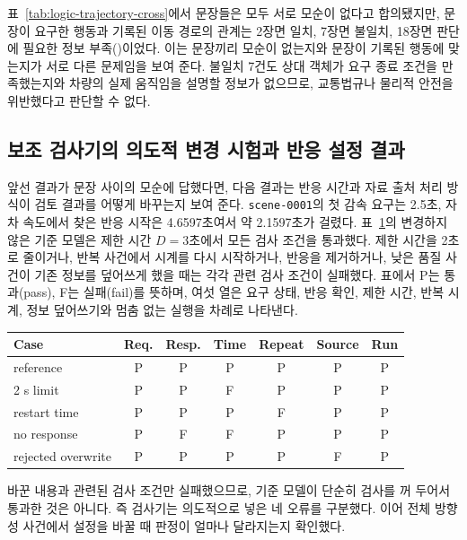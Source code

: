 표~\ref{tab:logic-trajectory-cross}에서 문장들은 모두 서로 모순이 없다고 합의됐지만, 문장이 요구한 행동과 기록된 이동 경로의 관계는 2장면 일치, 7장면 불일치, 18장면 판단에 필요한 정보 부족({\unknown})이었다. 이는 문장끼리 모순이 없는지와 문장이 기록된 행동에 맞는지가 서로 다른 문제임을 보여 준다. 불일치 7건도 상대 객체가 요구 종료 조건을 만족했는지와 차량의 실제 움직임을 설명할 정보가 없으므로, 교통법규나 물리적 안전을 위반했다고 판단할 수 없다.

\subsection{보조 검사기의 의도적 변경 시험과 반응 설정 결과}

앞선 결과가 문장 사이의 모순에 답했다면, 다음 결과는 반응 시간과 자료 출처 처리 방식이 검토 결과를 어떻게 바꾸는지 보여 준다. \texttt{scene-0001}의 첫 감속 요구는 2.5초, 자차 속도에서 찾은 반응 시작은 4.6597초여서 약 2.1597초가 걸렸다. 표~\ref{tab:scene1-results}의 변경하지 않은 기준 모델은 제한 시간 $D=3$초에서 모든 검사 조건을 통과했다. 제한 시간을 2초로 줄이거나, 반복 사건에서 시계를 다시 시작하거나, 반응을 제거하거나, 낮은 품질 사건이 기존 정보를 덮어쓰게 했을 때는 각각 관련 검사 조건이 실패했다. 표에서 P는 통과(pass), F는 실패(fail)를 뜻하며, 여섯 열은 요구 상태, 반응 확인, 제한 시간, 반복 시계, 정보 덮어쓰기와 멈춤 없는 실행을 차례로 나타낸다.

\begin{table}[H]
\centering
{}
\label{tab:scene1-results}
\scriptsize
\setlength{\tabcolsep}{2.5pt}
\begin{tabular}{lcccccc}
\toprule
Case & Req. & Resp. & Time & Repeat & Source & Run \\
\midrule
reference & P & P & P & P & P & P \\
2 s limit & P & P & F & P & P & P \\
restart time & P & P & P & F & P & P \\
no response & P & F & F & P & P & P \\
rejected overwrite & P & P & P & P & F & P \\
\bottomrule
\end{tabular}
\end{table}

바꾼 내용과 관련된 검사 조건만 실패했으므로, 기준 모델이 단순히 검사를 꺼 두어서 통과한 것은 아니다. 즉 검사기는 의도적으로 넣은 네 오류를 구분했다. 이어 전체 방향성 사건에서 설정을 바꿀 때 판정이 얼마나 달라지는지 확인했다.

